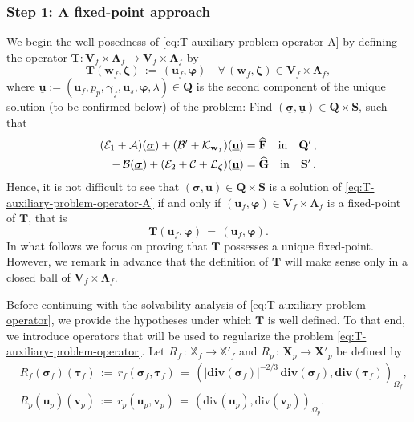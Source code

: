 \documentclass[11pt]{article}
\numberwithin{equation}{section}
\newcommand{\ds}{\displaystyle}
\newcommand{\bgamma}{{\boldsymbol\gamma}}
\newcommand{\bLambda}{{\boldsymbol\Lambda}}
\newcommand{\bsi}{{\boldsymbol\sigma}}
\newcommand{\bvarphi}{{\boldsymbol\varphi}}
\newcommand{\btau}{{\boldsymbol\tau}}
\newcommand{\bzeta}{{\boldsymbol\zeta}}
\newcommand{\ubsi}{\underline{\bsi}}
\newcommand{\ubu}{\underline{\bu}}
\newcommand{\bv}{{\mathbf{v}}}
\newcommand{\bw}{{\mathbf{w}}}
\newcommand{\bu}{\mathbf{u}}
\newcommand{\0}{{\mathbf{0}}}
\def\bF{\mathbf{F}}
\def\bG{\mathbf{G}}
\def\bX{\mathbf{X}}
\def\bV{\mathbf{V}}
\def\bT{\mathbf{T}}
\def\bQ{\mathbf{Q}}
\def\bS{\mathbf{S}}
\newcommand\bbX{\mathbb{X}}
\newcommand{\cA}{\mathcal{A}}
\newcommand{\cB}{\mathcal{B}}
\newcommand{\cC}{\mathcal{C}}
\newcommand{\cE}{\mathcal{E}}
\newcommand{\cK}{\mathcal{K}}
\newcommand{\cL}{\mathcal{L}}
\def\bdiv{\mathbf{div}}
\def\div{\mathrm{div}}
\def\qin{{\quad\hbox{in}\quad}}
\def\wh{\widehat}
\numberwithin{equation}{section}
\begin{document}
\subsubsection{Step 1: A fixed-point approach}\label{sec:fixed-point-approach}
We begin the well-posedness of \eqref{eq:T-auxiliary-problem-operator-A} by defining the operator $\bT : \bV_f \times \bLambda_f\to \bV_f\times \bLambda_f$ by
\begin{equation}\label{eq:definition-operator-T}
\bT(\bw_f,\bzeta) \,:=\, (\bu_f,\bvarphi) \quad \forall\,(\bw_f,\bzeta)\in \bV_f\times \bLambda_f,
\end{equation}
where $\ubu := (\bu_f, p_p, \bgamma_f, \bu_s, \bvarphi, \lambda)\in \bQ$ is the second component of the unique solution (to be confirmed below) of the problem:
Find $(\ubsi,\ubu)\in \bQ\times \bS$, such that
\begin{align}
(\cE_1 + \cA)(\ubsi) + (\cB' + \cK_{\bw_f})(\ubu) &= \wh{\bF} \qin \bQ'\,, \nonumber\\ 
-\,\cB(\ubsi) + (\cE_2 + \cC +\cL_{\bzeta})(\ubu) &= \wh{\bG} \qin \bS'\,. \label{eq:T-auxiliary-problem-operator}
\end{align}
Hence, it is not difficult to see that $(\ubsi,\ubu)\in \bQ\times \bS$ is a solution of \eqref{eq:T-auxiliary-problem-operator-A} if and only if $(\bu_f,\bvarphi)\in \bV_f\times \bLambda_f$ is a fixed-point of $\bT$, that is
\begin{equation*}%
\bT(\bu_f,\bvarphi) \,=\, (\bu_f,\bvarphi).
\end{equation*}
In what follows we focus on proving that $\bT$ possesses a unique fixed-point.
However, we remark in advance that the definition of $\bT$ will make sense only in a closed ball of $\bV_f\times \bLambda_f$.

Before continuing with the solvability analysis of \eqref{eq:T-auxiliary-problem-operator}, we provide the hypotheses under which $\bT$ is well defined.
To that end, we introduce operators that will be used to regularize the problem \eqref{eq:T-auxiliary-problem-operator}.
Let $R_f\,:\,\bbX_f\to \bbX'_f$ and $R_p\,:\,\bX_p\to \bX'_p$ be defined by
\begin{subequations}\label{eq:Rf-Rp-definition}
\begin{align}
& \ds R_f(\bsi_f)(\btau_f) \,:=\, r_f(\bsi_f, \btau_f) 
\,=\, (|\bdiv(\bsi_f)|^{-2/3}\,\bdiv(\bsi_f),\bdiv(\btau_f))_{\Omega_f}, \label{eq: R_f defn} \\[1ex]
& \ds R_p(\bu_p)(\bv_p) \,:=\, r_p(\bu_p, \bv_p)
\,=\, (\div(\bu_p),\div(\bv_p))_{\Omega_p}. \label{eq:R_p defn} 
\end{align}
\end{subequations}
\end{document}
